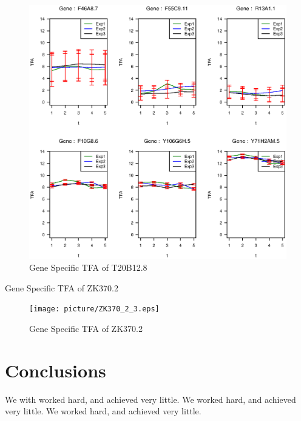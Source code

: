 \documentclass[12pt]{article}
\begin{document}
      \begin{figure}[h]
      \includegraphics[width=1.0\linewidth]{picture/T20B12_8_3.eps}
      \caption{Gene Specific TFA of T20B12.8}
      \end{figure}


      
      Gene Specific TFA of ZK370.2
      
      \begin{figure}[h]
      \texttt{[image: picture/ZK370\_2\_3.eps]}
      \caption{Gene Specific TFA of ZK370.2}
      \end{figure}



\section{Conclusions}\label{conclusions}
We with worked hard, and achieved very little. We worked hard, and achieved very little. We worked hard, and achieved very little.



\end{document}
